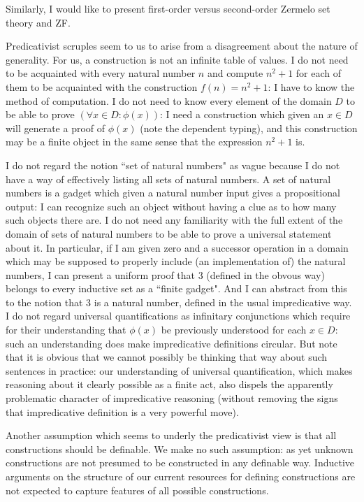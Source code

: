 \documentclass[12pt]{article}
\begin{document}
Similarly, I would like to present first-order versus second-order Zermelo set theory and ZF.

Predicativist scruples seem to us to arise from a disagreement about the nature of generality.  For us, a construction is not an infinite table of values.  I do not need to be acquainted with
every natural number $n$ and compute $n^2+1$ for each of them to be acquainted with the construction $f(n) = n^2+1$:  I have to know the method of computation.  I do not need
to know every element of the domain $D$ to be able to prove $(\forall x \in D:\phi(x))$:  I need a construction which given an $x \in D$ will generate a proof of $\phi(x)$ (note the dependent typing), and this construction may be a finite object in the same sense that the expression $n^2+1$ is.

I do not regard the notion ``set of natural numbers" as vague because I do not have a way of effectively listing all sets of natural numbers.   A set of natural numbers is a gadget which given a natural number input gives a propositional output:  I can recognize such an object without having a clue as to how many such objects there are.  I do not need any familiarity with the full extent of the domain of sets of natural numbers to be able to prove a universal statement about it.   In particular, if I am given zero and a successor operation in a domain which may be supposed to properly include (an implementation of) the natural numbers, I can present a uniform proof that 3 (defined in the obvous way) belongs to every inductive set  as a ``finite gadget".  And I can abstract from this to the notion that 3 is a natural number, defined in the usual impredicative way.  I do not regard universal quantifications as infinitary conjunctions which require for their understanding that
$\phi(x)$ be previously understood for each $x \in D$:  such an understanding does make impredicative definitions circular.  But note that it is obvious that we cannot possibly be thinking that way about such sentences in practice:  our understanding of universal quantification, which makes reasoning about it clearly possible as a finite act, also dispels the apparently problematic character of impredicative reasoning (without removing the signs that impredicative definition  is a very powerful move).

Another assumption which seems to underly the predicativist view is that all constructions should be definable.  We make no such assumption: as yet unknown constructions are not presumed to be constructed in any definable way.  Inductive arguments on the structure of our current resources for defining constructions are not expected to capture features of all possible constructions.
\end{document}
